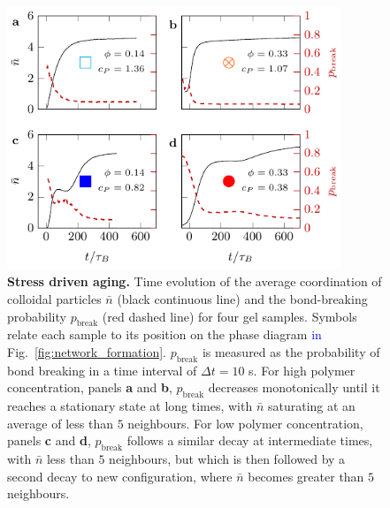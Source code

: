 \documentclass[preprint,amsmath,amssymb,superscriptaddress]{revtex4-1}
\begin{document}
\begin{figure}
 \includegraphics[width=10cm]{bond_breaking.pdf}
 \caption{{\bf Stress driven aging.} Time evolution of the average coordination of colloidal particles $\bar{n}$ (black continuous line) and the bond-breaking probability $p_\text{break}$ (red dashed line) for four gel samples. Symbols relate each sample to its position on the phase diagram \textcolor{blue}{in} Fig.~\ref{fig:network_formation}. $p_\text{break}$ is measured as the probability of bond breaking in a time interval of $\Delta t=10$ s. For high polymer concentration, panels {\bf a} and {\bf b}, $p_\text{break}$ decreases monotonically until it reaches a stationary state at long times, with $\bar{n}$ saturating at an average of less than $5$ neighbours. For low polymer concentration, panels {\bf c} and {\bf d}, $p_\text{break}$ follows a similar decay at intermediate times, with $\bar{n}$ less than $5$ neighbours, but which is then followed by a second decay to new configuration, where $\bar{n}$ becomes greater than $5$ neighbours.}
 \label{fig:bond_breaking}
\end{figure}
\end{document}
